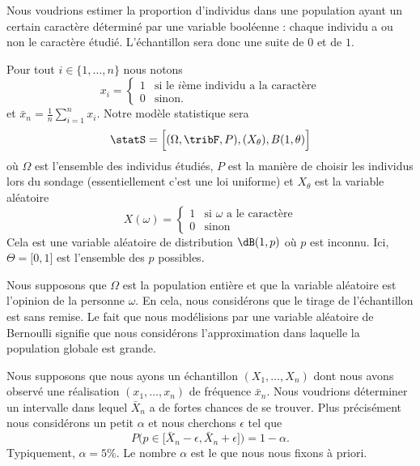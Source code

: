 Nous voudrions estimer la proportion d'individus dans une population ayant un certain caractère déterminé par une variable booléenne : chaque individu a ou non le caractère étudié. L'échantillon sera donc une suite de \( 0\) et de \( 1\).

Pour tout \( i\in\{ 1,\ldots, n \}\) nous notons
\begin{equation}
    x_i=\begin{cases}
        1    &   \text{si le } i\text{ème individu a la caractère}\\
        0    &    \text{sinon}.
    \end{cases}
\end{equation}
et \( \bar x_n=\frac{1}{ n }\sum_{i=1}^n x_i\). Notre modèle statistique sera
\begin{equation}
    \statS=\Big[ (\Omega,\tribF,P),(X_{\theta}),B(1,\theta) \Big]
\end{equation}
où \( \Omega\) est l'ensemble des individus étudiés, \( P\) est la manière de choisir les individus lors du sondage (essentiellement c'est une loi uniforme) et \( X_{\theta}\) est la variable aléatoire
\begin{equation}
    X(\omega)=\begin{cases}
        1    &   \text{si } \omega\text{ a le caractère}\\
        0    &    \text{sinon}
    \end{cases}
\end{equation}
Cela est une variable aléatoire de distribution \( \dB(1,p)\) où \( p\) est inconnu. Ici, \( \Theta=\mathopen[ 0 , 1 \mathclose]\) est l'ensemble des \( p\) possibles.

\begin{remark}
    Nous supposons que \( \Omega\) est la population entière et que la variable aléatoire est l'opinion de la personne \( \omega\). En cela, nous considérons que le tirage de l'échantillon est sans remise. Le fait que nous modélisions par une variable aléatoire de Bernoulli signifie que nous considérons l'approximation dans laquelle la population globale est grande.
\end{remark}

Nous supposons que nous ayons un échantillon \( (X_1,\ldots,X_n)\) dont nous avons observé une réalisation \( (x_1,\ldots,x_n)\) de fréquence \( \bar x_n\). Nous voudrions déterminer un intervalle dans lequel \( \bar X_n\) a de fortes chances de se trouver. Plus précisément nous considérons un petit \( \alpha\) et nous cherchons \( \epsilon\) tel que
\begin{equation}
    P\big( p\in\mathopen[ \bar X_n-\epsilon , \bar X_n+\epsilon \mathclose] \big)=1-\alpha.
\end{equation}
Typiquement, \( \alpha=5\%\). Le nombre \( \alpha\) est le  que nous nous fixons à priori.

